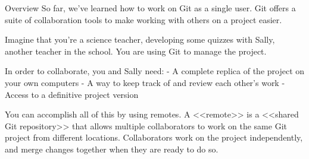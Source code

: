 Overview
    So far, we’ve learned how to work on Git as a single user. Git offers a suite of collaboration tools to make working with others on a project easier.

    Imagine that you’re a science teacher, developing some quizzes with Sally, another teacher in the school. You are using Git to manage the project.

    In order to collaborate, you and Sally need:
        - A complete replica of the project on your own computers
        - A way to keep track of and review each other’s work
        - Access to a definitive project version
    
    You can accomplish all of this by using remotes. A <<remote>> is a <<shared Git repository>> that allows multiple collaborators to work on the same Git project from different locations. Collaborators work on the project independently, and merge changes together when they are ready to do so.